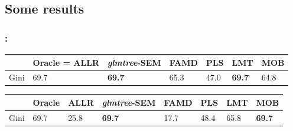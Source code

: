 \documentclass[english,xcolor={rgb,dvipsnames,table,usenames}]{beamer}
\begin{document}
\subsection{Some results}

\begin{frame}
\frametitle{\secname: \subsecname}

\begin{table}[t]
\centering
\begin{tabular}{ll|lllll}
 & Oracle = ALLR & \textit{glmtree}-SEM & FAMD & PLS & LMT & MOB \\
\hline
Gini & 69.7 & \textbf{69.7} & 65.3 & 47.0 & \textbf{69.7} & 64.8 \\
\end{tabular}
\end{table}

\bigskip

\begin{table}[t]
\centering
\begin{tabular}{ll|llllll}
 & Oracle & ALLR & \textit{glmtree}-SEM & FAMD & PLS & LMT & MOB \\
\hline
Gini & 69.7 & 25.8 & \textbf{69.7} & 17.7 & 48.4 & 65.8 & \textbf{69.7} \\
\end{tabular}
\end{table}

\end{frame}



%
%
%
%
%
%
%
%
%
%
%
%
%
%
%
%
\end{document}

